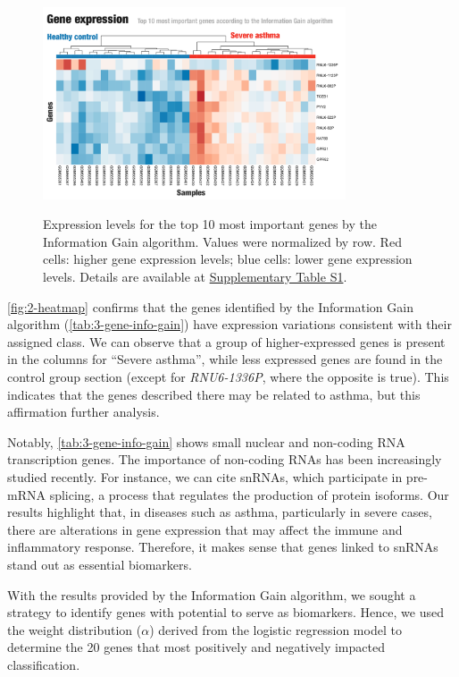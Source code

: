 \begin{figure}[htbp] \centering
  \includegraphics[width=0.8\textwidth]{figures/2-heatmap.png}
   \label{fig:2-heatmap}
  \caption{Expression levels for the top 10 most important genes by the Information Gain algorithm. Values were normalized by row. Red cells: higher gene expression levels; blue cells: lower gene expression levels. Details are available at \href{https://github.com/LBS-UFMG/asthma_microarray/blob/main/supplementary_material.pdf}{Supplementary Table S1}.}
\end{figure} %

\autoref{fig:2-heatmap} confirms that the genes identified by the Information Gain algorithm (\autoref{tab:3-gene-info-gain}) have expression variations consistent with their assigned class. We can observe that a group of higher-expressed genes is present in the columns for ``Severe asthma'', while less expressed genes are found in the control group section (except for \textit{RNU6-1336P}, where the opposite is true). This indicates that the genes described there may be related to asthma, but this affirmation further analysis.

Notably, \autoref{tab:3-gene-info-gain} shows small nuclear and non-coding RNA transcription genes. The importance of non-coding RNAs has been increasingly studied recently. For instance, we can cite snRNAs, which participate in pre-mRNA splicing, a process that regulates the production of protein isoforms. Our results highlight that, in diseases such as asthma, particularly in severe cases, there are alterations in gene expression that may affect the immune and inflammatory response. Therefore, it makes sense that genes linked to snRNAs stand out as essential biomarkers.

With the results provided by the Information Gain algorithm, we sought a strategy to identify genes with potential to serve as biomarkers. Hence, we used the weight distribution ($\alpha$) derived from the logistic regression model to determine the 20 genes that most positively and negatively impacted classification.


